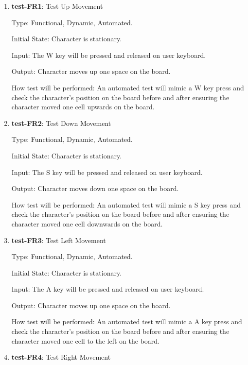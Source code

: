 \documentclass[12pt, titlepage]{article}
\begin{document}
\begin{enumerate}

\item{\textbf{test-FR1}: Test Up Movement\\}

Type: Functional, Dynamic, Automated.
					
Initial State: Character is stationary.
					
Input: The W key will be pressed and released on user keyboard.
					
Output: Character moves up one space on the board.
					
How test will be performed:  An automated test will mimic a W key press and check the character's position on the board before and after ensuring the character moved one cell upwards on the board.
					
\item{\textbf{test-FR2}: Test Down Movement\\}

Type: Functional, Dynamic, Automated.
					
Initial State: Character is stationary.
					
Input: The S key will be pressed and released on user keyboard.
					
Output: Character moves down one space on the board.
					
How test will be performed:  An automated test will mimic a S key press and check the character's position on the board before and after ensuring the character moved one cell downwards on the board.
					
\item{\textbf{test-FR3}: Test Left Movement\\}

Type: Functional, Dynamic, Automated.
					
Initial State: Character is stationary.
					
Input: The A key will be pressed and released on user keyboard.
					
Output: Character moves up one space on the board.
					
How test will be performed:  An automated test will mimic a A key press and check the character's position on the board before and after ensuring the character moved one cell to the left on the board.

\item{\textbf{test-FR4}: Test Right Movement\\}


\end{enumerate}
\end{document}
